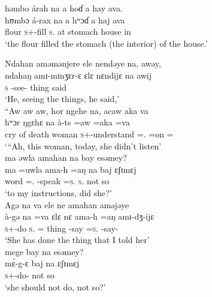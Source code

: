  \medskip
  həmbo  árah  na  a  hoɗ  a  hay  ava.\\
 \gll hʊmbɔ  á-rax           na      a     hʷɔɗ       a        haj     ava\\
 flour     \textsc{s}+{\IFV}-fill   \textsc{s}.{\DO}   at   stomach  {\GEN}   house     in\\
 \glt ‘the flour filled the stomach (the interior) of the house.’\\
 \z
 
 \ea  Ndahan  aməmənjere   ele  nendəye  na,  awəy,\\
 \gll ndahaŋ  amɪ-mɪnʒɛr{}-ɛ   ɛlɛ    nɛndijɛ  na awij\\
 \textsc{s}           {\DEP}-see-{\CL}        thing     {\DEM}   {\PSP}  said\\
 \glt ‘He, seeing the things, he said,’\\
 
 \medskip
 “Aw  aw  aw,  hor  ngehe  na,  acaw  aka  va  \\
   hʷɔr      ŋgɛhɛ    na  à-ts      =aw   =aka =va\\
 {cry of death}  woman  {\DEM}      {\PSP}  \textsc{s}+{\PFV}-understand  ={\oneS}.{\IO}  =on    ={\PRF}\\
 \glt ‘“Ah, this woman, today, she didn’t listen’\\
 
 \medskip
 ma  əwla  amahan  na  bay  esəmey?\\
 \gll ma    =uwla      ama-h    =aŋ  na  baj    ɛʃɪmɛj\\
 word  ={\oneS}.{\POSS}  {\DEP}-speak  =\textsc{s}.{\IO}   \textsc{s}.{\DO}   {\NEG}   {not so}\\
 \glt ‘to my instructions, did she?’ \\
 
 \medskip
 Agə  na  va  ele  ne  amahan  aməjəye  \\
 \gll à-gə na         =va       ɛlɛ      nɛ    ama-h  =aŋ  amɪ-dʒ-ijɛ  \\
 \textsc{s}+{\PFV}-do  \textsc{s}.{\DO}  ={\PRF}  thing  {\oneS}  {\DEP}-say  =\textsc{s}.{\IO}  {\DEP}-say-{\CL}      \\
 \glt ‘She has done the thing that I told her’\\
 
 \medskip
 mege  bay  na  esəmey?\\
 \gll m\`ɛ-g-ɛ            baj  na     ɛʃɪmɛj\\
 \textsc{s}+{\HOR}-do-{\CL}  {\NEG}   {\PSP}  {not so}\\
 \glt ‘she should not do, not so?’\\
 
